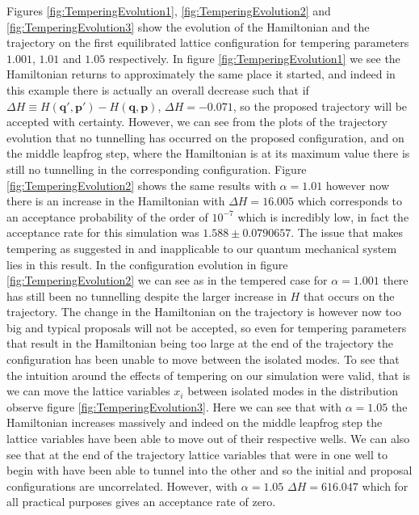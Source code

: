 \documentclass[12pt]{article}
\begin{document}
Figures \ref{fig:TemperingEvolution1}, \ref{fig:TemperingEvolution2} and \ref{fig:TemperingEvolution3} show the evolution of the Hamiltonian and the trajectory on the first equilibrated lattice configuration for tempering parameters $1.001$, $1.01$ and $1.05$ respectively. In figure \ref{fig:TemperingEvolution1} we see the Hamiltonian returns to approximately the same place it started, and indeed in this example there is actually an overall decrease such that if $\Delta H \equiv H\left(\bm{q}',\bm{p}'\right)-H\left(\bm{q},\bm{p}\right)$, $\Delta H = -0.071$, so the proposed trajectory will be accepted with certainty. However, we can see from the plots of the trajectory evolution that no tunnelling has occurred on the proposed configuration, and on the middle leapfrog step, where the Hamiltonian is at its maximum value there is still no tunnelling in the corresponding configuration. Figure \ref{fig:TemperingEvolution2} shows the same results with $\alpha=1.01$ however now there is an increase in the Hamiltonian with $\Delta H = 16.005$ which corresponds to an acceptance probability of the order of $10^{-7}$ which is incredibly low, in fact the acceptance rate for this simulation was $1.588 \pm 0.0790657$. The issue that makes tempering as suggested in \cite{neal_2011} and \cite{neal_1996_b} inapplicable to our quantum mechanical system lies in this result. In the configuration evolution in figure \ref{fig:TemperingEvolution2} we can see as in the tempered case for $\alpha=1.001$ there has still been no tunnelling despite the larger increase in $H$ that occurs on the trajectory. The change in the Hamiltonian on the trajectory is however now too big and typical proposals will not be accepted, so even for tempering parameters that result in the Hamiltonian being too large at the end of the trajectory the configuration has been unable to move between the isolated modes. To see that the intuition around the effects of tempering on our simulation were valid, that is we can move the lattice variables $x_i$ between isolated modes in the distribution observe figure \ref{fig:TemperingEvolution3}. Here we can see that with $\alpha=1.05$ the Hamiltonian increases massively and indeed on the middle leapfrog step the lattice variables have been able to move out of their respective wells. We can also see that at the end of the trajectory lattice variables that were in one well to begin with have been able to tunnel into the other and so the initial and proposal configurations are uncorrelated. However, with $\alpha=1.05$ $\Delta H = 616.047$ which for all practical purposes gives an acceptance rate of zero. 
\end{document}
